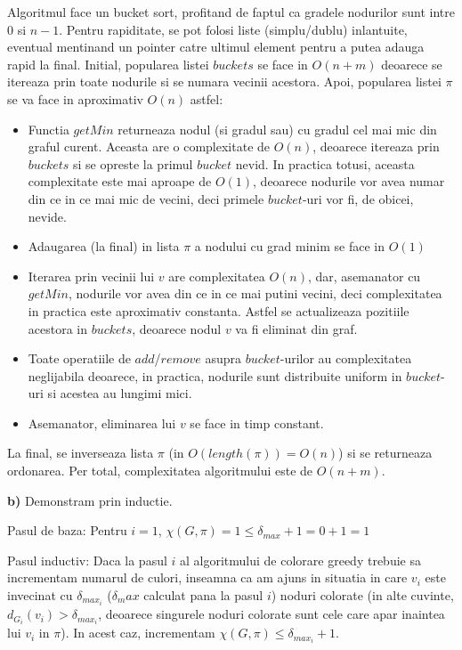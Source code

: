 \documentclass{article}
\begin{document}
Algoritmul face un bucket sort, profitand de faptul ca gradele nodurilor sunt intre $0$ si $n-1$. Pentru rapiditate, se pot folosi liste (simplu/dublu) inlantuite, eventual mentinand un pointer catre ultimul element pentru a putea adauga rapid la final. Initial, popularea listei $buckets$ se face in $O(n+m)$ deoarece se itereaza prin toate nodurile si se numara vecinii acestora. Apoi, popularea listei $\pi$ se va face in aproximativ $O(n)$ astfel:
\begin{itemize}
    \item Functia $getMin$ returneaza nodul (si gradul sau) cu gradul cel mai mic din graful curent. Aceasta are o complexitate de $O(n)$, deoarece itereaza prin $buckets$ si se opreste la primul $bucket$ nevid. In practica totusi, aceasta complexitate este mai aproape de $O(1)$, deoarece nodurile vor avea numar din ce in ce mai mic de vecini, deci primele $bucket$-uri vor fi, de obicei, nevide.
    \item Adaugarea (la final) in lista $\pi$ a nodului cu grad minim se face in $O(1)$
    \item Iterarea prin vecinii lui $v$ are complexitatea $O(n)$, dar, asemanator cu $getMin$, nodurile vor avea din ce in ce mai putini vecini, deci complexitatea in practica este aproximativ constanta. Astfel se actualizeaza pozitiile acestora in $buckets$, deoarece nodul $v$ va fi eliminat din graf.
    \item Toate operatiile de $add$/$remove$ asupra $bucket$-urilor au complexitatea neglijabila deoarece, in practica, nodurile sunt distribuite uniform in $bucket$-uri si acestea au lungimi mici.
    \item Asemanator, eliminarea lui $v$ se face in timp constant.
\end{itemize}
La final, se inverseaza lista $\pi$ (in $O(length(\pi)) = O(n)$) si se returneaza ordonarea. Per total, complexitatea algoritmului este de $O(n+m)$.

{\bf b)} Demonstram prin inductie. 

Pasul de baza: Pentru $i=1$, $\chi(G, \pi) = 1 \leq \delta_{max} + 1 = 0 + 1 = 1$ 

Pasul inductiv: Daca la pasul $i$ al algoritmului de colorare greedy trebuie sa incrementam numarul de culori, inseamna ca am ajuns in situatia in care $v_i$ este invecinat cu $\delta_{max_i}$ ($\delta_max$ calculat pana la pasul $i$) noduri colorate (in alte cuvinte, $d_{G_i}(v_i) > \delta_{max_i}$, deoarece singurele noduri colorate sunt cele care apar inaintea lui $v_i$ in $\pi$). In acest caz, incrementam $\chi(G, \pi) \leq \delta_{max_i} + 1$.
\end{document}
